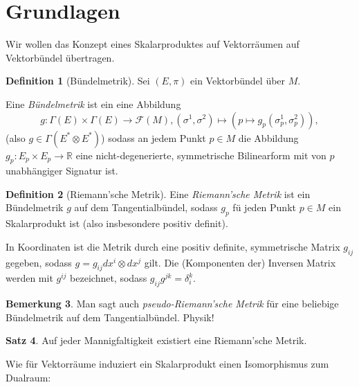 \documentclass[a4paper]{scrreprt}
\numberwithin{equation}{chapter}
\newcommand{\R}{\mathbb{R}}
\newcommand{\sm}{\mathcal{F}}
\theoremstyle{definition}
\newtheorem{defn}{Definition}[section]
\newtheorem{satz}[defn]{Satz}
\newtheorem{bem}[defn]{Bemerkung}
\begin{document}
	\section{Grundlagen}
		Wir wollen das Konzept eines Skalarproduktes auf Vektorräumen auf Vektorbündel übertragen.
		\begin{defn}[Bündelmetrik]
			Sei $(E,\pi)$ ein Vektorbündel über $M$.
			
			
			Eine \emph{Bündelmetrik} ist ein eine Abbildung
			\begin{equation*}
				g\colon \Gamma(E)\times\Gamma(E)\rightarrow \sm(M), (\sigma^1,\sigma^2)\mapsto (p\mapsto g_p(\sigma^1_p,\sigma^2_p)),
			\end{equation*}
			(also $g\in\Gamma(E^*\otimes E^*)$) sodass an jedem Punkt $p\in M$ die Abbildung $g_p\colon E_p\times E_p\rightarrow \R$ eine nicht-degenerierte, symmetrische Bilinearform mit von $p$ unabhängiger Signatur ist.
		\end{defn}
		\begin{defn}[Riemann'sche Metrik]
			Eine \emph{Riemann'sche Metrik} ist ein Bündelmetrik $g$ auf dem Tangentialbündel, sodass $g_p$ fü jeden Punkt $p\in M$ ein Skalarprodukt ist (also insbesondere positiv definit).
			
			In Koordinaten ist die Metrik durch eine positiv definite, symmetrische Matrix $g_{ij}$ gegeben, sodass $g=g_{ij}dx^i\otimes dx^j$ gilt. Die (Komponenten der) Inversen Matrix werden mit $g^{ij}$ bezeichnet, sodass $g_{ij}g^{jk}=\delta^k_i$.
		\end{defn}
		\begin{bem}
			Man sagt auch \emph{pseudo-Riemann'sche Metrik} für eine beliebige Bündelmetrik auf dem Tangentialbündel. Physik!
		\end{bem}
		\begin{satz}
			Auf jeder Mannigfaltigkeit existiert eine Riemann'sche Metrik.
		\end{satz}
		Wie für Vektorräume induziert ein Skalarprodukt einen Isomorphismus zum Dualraum:
\end{document}
